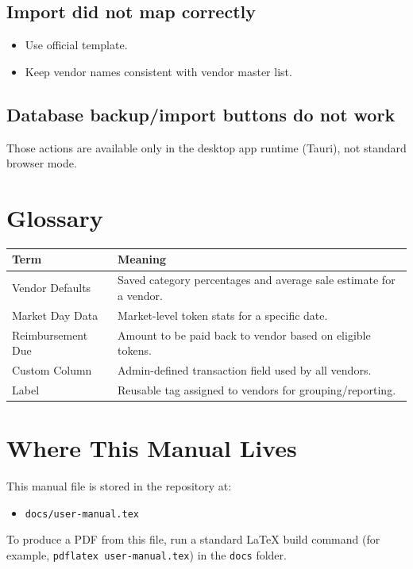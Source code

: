 \documentclass[11pt]{article}
\begin{document}
\subsection{Import did not map correctly}
\begin{itemize}
  \item Use official template.
  \item Keep vendor names consistent with vendor master list.
\end{itemize}

\subsection{Database backup/import buttons do not work}
Those actions are available only in the desktop app runtime (Tauri), not standard browser mode.

\section{Glossary}
\begin{tabularx}{\textwidth}{p{}X}
\textbf{Term} & \textbf{Meaning} \\
\hline
Vendor Defaults & Saved category percentages and average sale estimate for a vendor. \\
Market Day Data & Market-level token stats for a specific date. \\
Reimbursement Due & Amount to be paid back to vendor based on eligible tokens. \\
Custom Column & Admin-defined transaction field used by all vendors. \\
Label & Reusable tag assigned to vendors for grouping/reporting. \\
\end{tabularx}

\section{Where This Manual Lives}
This manual file is stored in the repository at:
\begin{itemize}
  \item \texttt{docs/user-manual.tex}
\end{itemize}

To produce a PDF from this file, run a standard LaTeX build command (for example, \texttt{pdflatex user-manual.tex}) in the \texttt{docs} folder.
\end{document}
